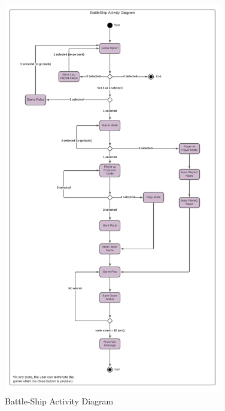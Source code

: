 \documentclass[12pt]{article}
\begin{document}
\begin{figure}[H]
    \centering
    \includegraphics[width=0.85\textwidth]{HEL_template/figures/BattleS.jpeg}
    \caption{Battle-Ship Activity Diagram}
    \label{battleship1}
\end{figure}
\end{document}
